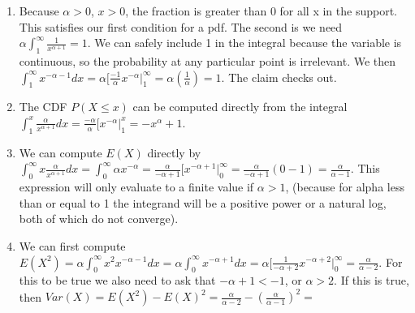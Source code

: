 \documentclass{article}
\begin{document}
\begin{prob}
	\begin{enumerate}
		\item Because $\alpha > 0$, $x > 0$, the fraction is greater than 0 for all x in the support.
		This satisfies our first condition for a pdf.
		The second is we need $\alpha\int_{1}^{\infty}\frac{1}{x^{\alpha +1}}=1$. We can safely include 1 in the integral because the variable is continuous, so the probability at any particular point is irrelevant.
		We then $\int_{1}^{\infty}x^{-\alpha -1}dx= \alpha \big[\frac{-1}{\alpha}x^{-\alpha} \big|^{\infty}_{1}=\alpha(\frac{1}{\alpha})=1$. The claim checks out.
	\item The CDF $P(X \leq x)$ can be computed directly from the integral $\int_{1}^{x}\frac{\alpha}{x^{\alpha +1}}dx=\frac{-\alpha}{\alpha}\big[x^{-\alpha}\big|^{x}_{1}=-x^{\alpha}+1$.
	\item We can compute $E(X)$ directly by $\int_{0}^{\infty}x\frac{\alpha}{x^{\alpha +1}}dx= \int^{\infty}_{0}\alpha x^{-\alpha}=\frac{\alpha}{-\alpha +1}\big[x^{-\alpha +1}\big|^{\infty}_{0}=\frac{\alpha}{-\alpha +1}(0-1)=\frac{\alpha}{\alpha -1}$.
		This expression will only evaluate to a finite value if $\alpha>1$, (because for alpha less than or equal to 1 the integrand will be a positive power or a natural log, both of which do not converge).
	
	\item We can first compute $E(X^2)=\alpha \int_{0}^{\infty} x^2x^{-\alpha-1}dx= \alpha \int_{0}^{\infty}x^{-\alpha +1}dx = \alpha\big[\frac{1}{-\alpha+2}x^{-\alpha+2}\big|^{\infty}_{0}=\frac{\alpha}{\alpha-2}$.
	For this to be true we also need to ask that $-\alpha+1 < -1$, or $\alpha>2$.
	If this is true, then $Var(X)=E(X^2)-E(X)^2=\frac{\alpha}{\alpha-2}-(\frac{\alpha}{\alpha -1})^2=$

	\end{enumerate}
\end{prob}
\end{document}
